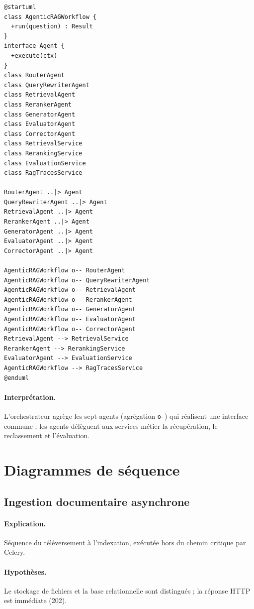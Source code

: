 \begin{lstlisting}[style=plantuml,caption={Diagramme de classes — moteur agentique},label={lst:agents}]
@startuml
class AgenticRAGWorkflow {
  +run(question) : Result
}
interface Agent {
  +execute(ctx)
}
class RouterAgent
class QueryRewriterAgent
class RetrievalAgent
class RerankerAgent
class GeneratorAgent
class EvaluatorAgent
class CorrectorAgent
class RetrievalService
class RerankingService
class EvaluationService
class RagTracesService

RouterAgent ..|> Agent
QueryRewriterAgent ..|> Agent
RetrievalAgent ..|> Agent
RerankerAgent ..|> Agent
GeneratorAgent ..|> Agent
EvaluatorAgent ..|> Agent
CorrectorAgent ..|> Agent

AgenticRAGWorkflow o-- RouterAgent
AgenticRAGWorkflow o-- QueryRewriterAgent
AgenticRAGWorkflow o-- RetrievalAgent
AgenticRAGWorkflow o-- RerankerAgent
AgenticRAGWorkflow o-- GeneratorAgent
AgenticRAGWorkflow o-- EvaluatorAgent
AgenticRAGWorkflow o-- CorrectorAgent
RetrievalAgent --> RetrievalService
RerankerAgent --> RerankingService
EvaluatorAgent --> EvaluationService
AgenticRAGWorkflow --> RagTracesService
@enduml
\end{lstlisting}

\paragraph{Interprétation.} L'orchestrateur agrège les sept agents (agrégation
\texttt{o--}) qui réalisent une interface commune ; les agents délèguent aux
services métier la récupération, le reclassement et l'évaluation.

\section{Diagrammes de séquence}
\subsection{Ingestion documentaire asynchrone}
\paragraph{Explication.} Séquence du téléversement à l'indexation, exécutée hors
du chemin critique par Celery.
\paragraph{Hypothèses.} Le stockage de fichiers et la base relationnelle sont
distingués ; la réponse HTTP est immédiate (202).

